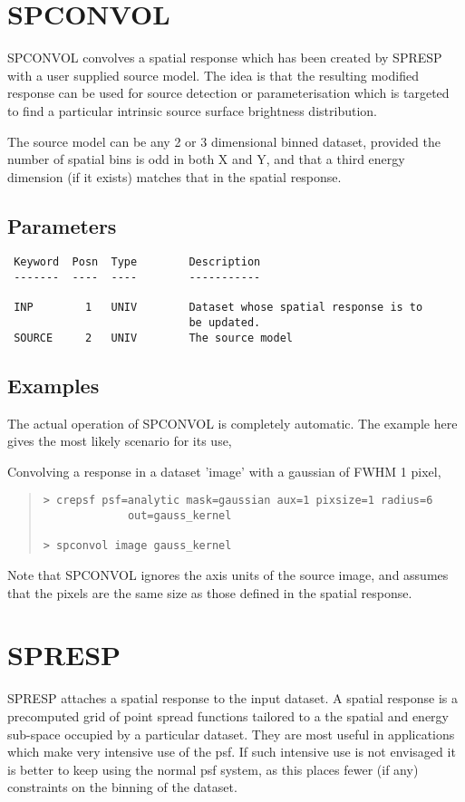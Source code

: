 \documentclass{book}
\renewcommand{\_}{{\tt\char'137}}     %
\begin{document}
\section{SPCONVOL}
SPCONVOL convolves a spatial response which has been created by
SPRESP with a user supplied source model. The idea is that
the resulting modified response can be used for source detection
or parameterisation which is targeted to find a particular
intrinsic source surface brightness distribution.

The source model can be any 2 or 3 dimensional binned dataset,
provided the number of spatial bins is odd in both X and Y,
and that a third energy dimension (if it exists) matches that
in the spatial response.

\subsection{Parameters}
\begin{verbatim}
 Keyword  Posn  Type        Description
 -------  ----  ----        -----------

 INP        1   UNIV        Dataset whose spatial response is to
                            be updated.
 SOURCE     2   UNIV        The source model

\end{verbatim}\subsection{Examples}
The actual operation of SPCONVOL is completely automatic. The
example here gives the most likely scenario for its use,

Convolving a response in a dataset 'image' with a gaussian of
FWHM 1 pixel,
\begin{quote}\begin{verbatim}
> crepsf psf=analytic mask=gaussian aux=1 pixsize=1 radius=6
             out=gauss_kernel

> spconvol image gauss_kernel
\end{verbatim}\end{quote}
Note that SPCONVOL ignores the axis units of the source image,
and assumes that the pixels are the same size as those defined
in the spatial response.

\section{SPRESP}
SPRESP attaches a spatial response to the input dataset. A spatial
response is a precomputed grid of point spread functions tailored
to a the spatial and energy sub-space occupied by a particular
dataset. They are most useful in applications which make very
intensive use of the psf. If such intensive use is not envisaged it
is better to keep using the normal psf system, as this places fewer
(if any) constraints on the binning of the dataset.
\end{document}
